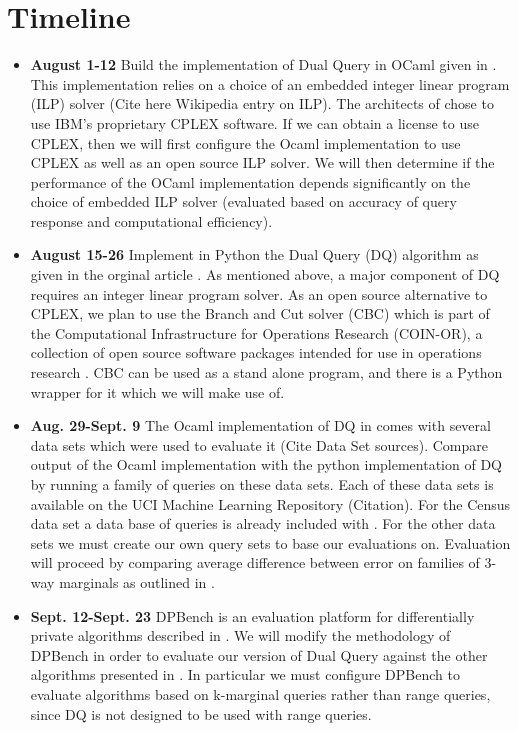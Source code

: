 \documentclass{article}
\begin{document}
 
\section{Timeline}

\begin{itemize}
  \item \textbf{August 1-12} {Build the implementation of Dual Query in OCaml given in \cite{Arias2015}. This implementation relies on a choice of an embedded integer linear program (ILP) solver (Cite here Wikipedia entry on ILP). The architects of \cite{Arias2015} chose to use IBM's proprietary CPLEX software. If we can obtain a license to use CPLEX, then we will first configure the Ocaml implementation to use CPLEX as well as an open source ILP solver. We will then determine if the performance of the OCaml implementation depends significantly on the choice of embedded ILP solver (evaluated based on accuracy of query response and computational efficiency).}
  
  \item \textbf{August 15-26} {Implement in Python the Dual Query (DQ) algorithm as given in the orginal article \cite{DBLP:journals-corr-GaboardiAHRW14}. As mentioned above, a major component of DQ requires an integer linear program solver. As an open source alternative to CPLEX, we plan to use the Branch and Cut solver (CBC) which is part of the Computational Infrastructure for Operations Research (COIN-OR), a collection of open source software packages intended for use in operations research \cite{COIN-OR-CBC}. CBC can be used as a stand alone program, and there is a Python wrapper for it \cite{CyLP} which we will make use of.}

  \item \textbf{Aug. 29-Sept. 9} {The Ocaml implementation of DQ in \cite{Arias2015} comes with several data sets which were used to evaluate it (Cite Data Set sources). Compare output of the Ocaml implementation with the python implementation of DQ by running a family of queries on these data sets. Each of these data sets is available on the UCI Machine Learning Repository (Citation). For the Census data set a data base of queries is already included with \cite{Arias2015}. For the other data sets we must create our own query sets to base our evaluations on. Evaluation will proceed by comparing average difference between error on families of 3-way marginals as outlined in \cite[Section~7]{DBLP:journals-corr-GaboardiAHRW14}.}
  
  \item \textbf{Sept. 12-Sept. 23} {DPBench is an evaluation platform for differentially private algorithms described in \cite{Hay:2016:PED:2882903.2882931}. We will modify the methodology of DPBench in order to evaluate our version of Dual Query against the other algorithms presented in \cite{Hay:2016:PED:2882903.2882931}. In particular we must configure DPBench to evaluate algorithms based on k-marginal queries rather than range queries, since DQ is not designed to be used with range queries.}
  

\end{itemize}
\end{document}
